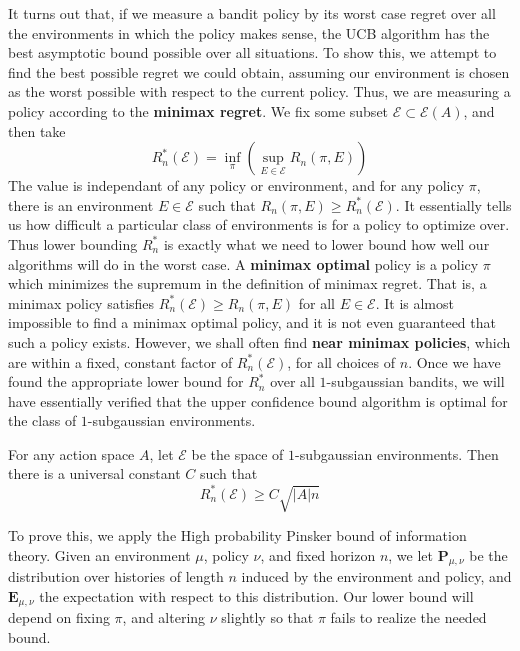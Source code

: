 It turns out that, if we measure a bandit policy by its worst case regret over all the environments in which the policy makes sense, the UCB algorithm has the best asymptotic bound possible over all situations. To show this, we attempt to find the best possible regret we could obtain, assuming our environment is chosen as the worst possible with respect to the current policy. Thus, we are measuring a policy according to the {\bf minimax regret}. We fix some subset $\mathcal{E} \subset \mathcal{E}(A)$, and then take
%
\[ R_n^*(\mathcal{E}) = \inf_\pi \left( \sup_{E \in \mathcal{E}} R_n(\pi, E) \right) \]
%
The value is independant of any policy or environment, and for any policy $\pi$, there is an environment $E \in \mathcal{E}$ such that $R_n(\pi, E) \geq R_n^*(\mathcal{E})$. It essentially tells us how difficult a particular class of environments is for a policy to optimize over. Thus lower bounding $R_n^*$ is exactly what we need to lower bound how well our algorithms will do in the worst case. A {\bf minimax optimal} policy is a policy $\pi$ which minimizes the supremum in the definition of minimax regret. That is, a minimax policy satisfies $R_n^*(\mathcal{E}) \geq R_n(\pi, E)$ for all $E \in \mathcal{E}$. It is almost impossible to find a minimax optimal policy, and it is not even guaranteed that such a policy exists. However, we shall often find {\bf near minimax policies}, which are within a fixed, constant factor of $R_n^*(\mathcal{E})$, for all choices of $n$. Once we have found the appropriate lower bound for $R_n^*$ over all $1$-subgaussian bandits, we will have essentially verified that the upper confidence bound algorithm is optimal for the class of $1$-subgaussian environments.

\begin{theorem}
    For any action space $A$, let $\mathcal{E}$ be the space of $1$-subgaussian environments. Then there is a universal constant $C$ such that
    \[ R_n^*(\mathcal{E}) \geq C \sqrt{|A| n} \]
\end{theorem}

To prove this, we apply the High probability Pinsker bound of information theory. Given an environment $\mu$, policy $\nu$, and fixed horizon $n$, we let $\mathbf{P}_{\mu, \nu}$ be the distribution over histories of length $n$ induced by the environment and policy, and $\mathbf{E}_{\mu, \nu}$ the expectation with respect to this distribution. Our lower bound will depend on fixing $\pi$, and altering $\nu$ slightly so that $\pi$ fails to realize the needed bound.

